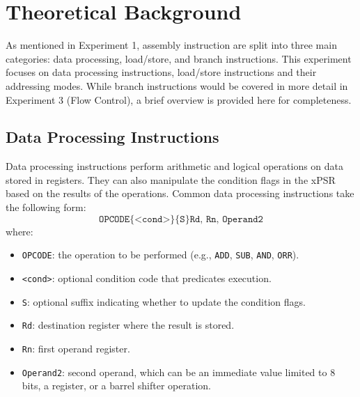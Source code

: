 \newpage
\tableofcontents
\newpage
\section{Theoretical Background}
As mentioned in Experiment 1, assembly instruction are split into three main categories: data processing, load/store, and branch instructions. This experiment focuses on data processing instructions, load/store instructions and their addressing modes. While branch instructions would be covered in more detail in Experiment 3 (Flow Control), a brief overview is provided here for completeness.
\subsection{Data Processing Instructions}
Data processing instructions perform arithmetic and logical operations on data stored in registers. They can also manipulate the condition flags in the xPSR based on the results of the operations. Common data processing instructions take the following form:
\[
\texttt{OPCODE\{<cond>\}\{S\} Rd, Rn, Operand2}
\]
where:
\begin{itemize}[nosep]
  \item \texttt{OPCODE}: the operation to be performed (e.g., \texttt{ADD}, \texttt{SUB}, \texttt{AND}, \texttt{ORR}).
  \item \texttt{<cond>}: optional condition code that predicates execution.
  \item \texttt{S}: optional suffix indicating whether to update the condition flags.
  \item \texttt{Rd}: destination register where the result is stored.
  \item \texttt{Rn}: first operand register.
  \item \texttt{Operand2}: second operand, which can be an immediate value limited to 8 bits, a register, or a barrel shifter operation.
\end{itemize}


